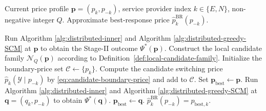 \documentclass[lettersize,journal]{IEEEtran}
\begin{document}
\begin{algorithm}[!t]
\caption{Best-Response Estimation for Service Provider $k$ via Boundary Prices}
\label{alg:br-boundary-price}
\begin{algorithmic}[1]
\REQUIRE Current price profile $\boldsymbol{p}=(p_k,p_{-k})$, service provider index $k\in\{E,N\}$, non-negative integer $Q$.
\ENSURE Approximate best-response price $\widehat p_k^{\mathrm{BR}}(p_{-k})$.

\STATE Run Algorithm \ref{alg:distributed-inner} and Algorithm \ref{alg:distributed-greedy-SCM} at $\boldsymbol p$ to obtain the Stage-II outcome $\Psi^*(\boldsymbol p)$.
\STATE Construct the local candidate family $\mathcal N_Q(\boldsymbol p)$ according to Definition~\ref{def:local-candidate-family}.
\STATE Initialize the boundary-price set $\mathcal C\leftarrow \{p_k\}$.
    \STATE Compute the candidate switching price $\widehat p_k(\mathcal Y\mid p_{-k})$ by \eqref{eq:candidate-boundary-price} and add to $\mathcal C$.
\ENDFOR
\STATE Set $\boldsymbol p_{\mathrm{best}}\leftarrow \boldsymbol p$.
    \STATE Run Algorithm \ref{alg:distributed-inner} and Algorithm \ref{alg:distributed-greedy-SCM} at $\boldsymbol q=(q_k,p_{-k})$ to obtain $\Psi^*(\boldsymbol q)$.
        \STATE $\boldsymbol p_{\mathrm{best}}\leftarrow \boldsymbol q$.
    \ENDIF
\ENDFOR
\RETURN $\widehat p_k^{\mathrm{BR}}(p_{-k})=p_{\mathrm{best},k}$.
\end{algorithmic}
\end{algorithm}
\end{document}

